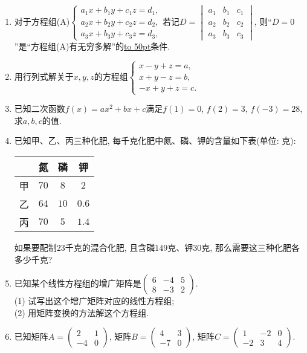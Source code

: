 \documentclass[10pt,a4paper]{article}
\newcommand{\blank}[1]{\underline{\hbox to #1pt{}}}
\begin{document}
\begin{enumerate}[1.]
\item 对于方程组(A)$\begin{cases}    a_1x+b_1y+c_1z=d_1,  \\a_2x+b_2y+c_2z=d_2,  \\a_3x+b_3y+c_3z=d_3,  \end{cases}$若记$D=\begin{vmatrix}    a_1 & b_1 & c_1  \\a_2 & b_2 & c_2  \\a_3 & b_3 & c_3  \end{vmatrix}$, 则``$D=0$''是``方程组(A)有无穷多解''的\blank{50}条件.
\item 用行列式解关于$x,y,z$的方程组$\begin{cases}
    x-y+z=a,  \\x+y-z=b,  \\-x+y+z=c.  \end{cases}$
\item 已知二次函数$f(x)=ax^2+bx+c$满足$f(1)=0$, $f(2)=3$, $f(-3)=28$, 求$a,b,c$的值.
\item 已知甲、乙、丙三种化肥, 每千克化肥中氮、磷、钾的含量如下表(单位: 克):
\begin{center}
    \begin{tabular}{|c|c|c|c|}
        \hline
         & 氮 & 磷 & 钾\\ \hline
        甲 & $70$ & $8$ & $2$\\ \hline
        乙 & $64$ & $10$ & $0.6$\\ \hline
        丙 & $70$ & $5$ & $1.4$\\ \hline
    \end{tabular}
\end{center}
如果要配制$23$千克的混合化肥, 且含磷$149$克、钾$30$克, 那么需要这三种化肥各多少千克?
\item 已知某个线性方程组的增广矩阵是$\begin{pmatrix}
    6 & -4 & 5  \\8 & -3 & 2  \end{pmatrix}$.\\
(1) 试写出这个增广矩阵对应的线性方程组;\\
(2) 用矩阵变换的方法解这个方程组.
\item 已知矩阵$A=\begin{pmatrix}    2 & 1  \\-4 & 0  \end{pmatrix}$, 矩阵$B=\begin{pmatrix}    4 & 3  \\-7 & 0  \end{pmatrix}$, 矩阵$C=\begin{pmatrix}    1 & -2 & 0  \\-2 & 3 & 4  \end{pmatrix}$.\\

\end{enumerate}
\end{document}
